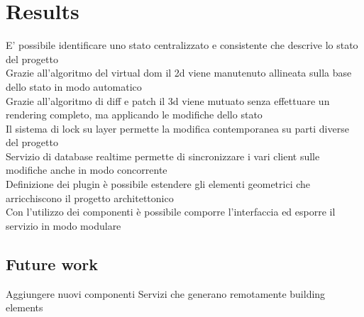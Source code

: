 \section{Results}


E' possibile identificare uno stato centralizzato e consistente che descrive lo stato del progetto\\
Grazie all'algoritmo del virtual dom il 2d viene manutenuto allineata sulla base dello stato in modo automatico\\
Grazie all'algoritmo di diff e patch il 3d viene mutuato senza effettuare un rendering completo, ma applicando le modifiche dello stato\\
Il sistema di lock su layer permette la modifica contemporanea su parti diverse del progetto\\
Servizio di database realtime permette di sincronizzare i vari client sulle modifiche anche in modo concorrente\\
Definizione dei plugin è possibile estendere gli elementi geometrici che arricchiscono il progetto architettonico\\
Con l'utilizzo dei componenti è possibile comporre l'interfaccia ed esporre il servizio in modo modulare\\



\subsection{Future work}
Aggiungere nuovi componenti
Servizi che generano remotamente building elements
